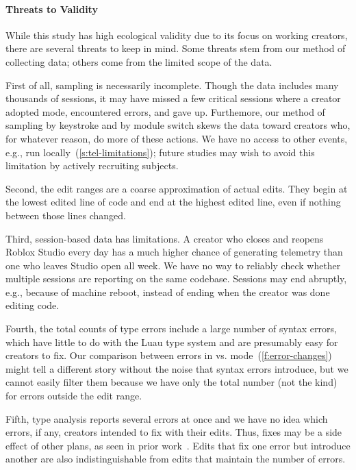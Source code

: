 \documentclass[english,submission,cleveref]{programming}
\begin{document}
\paragraph{Threats to Validity}
\label{s:threats}

While this study has high ecological validity due to its focus on
working creators, there are several threats to keep in mind.
Some threats stem from our method of collecting data; others
come from the limited scope of the data.

First of all, sampling is necessarily incomplete.
Though the data includes many thousands of sessions, it
may have missed a few critical sessions where a creator
adopted \mstrict{} mode, encountered  errors,
and gave up.
Furthemore, our method of sampling by keystroke and by module switch
skews the data toward creators who, for whatever reason, do more
of these actions.
We have no access to other events, e.g., run locally~(\cref{s:tel-limitations});
future studies may wish to avoid this limitation by actively
recruiting subjects.

Second, the edit ranges are a coarse approximation of actual edits.
They begin at the lowest edited line of code and end at the highest
edited line, even if nothing between those lines changed.

Third, session-based data has limitations.
A creator who closes and reopens Roblox Studio every day has
a much higher chance of generating telemetry than one who
leaves Studio open all week.
We have no way to reliably check whether multiple sessions are
reporting on the same codebase.
Sessions may end abruptly, e.g., because of machine reboot,
instead of ending when the creator was done editing code.

Fourth, the total counts of type errors include a large number of syntax errors,
which have little to do with the Luau type system and are presumably easy for
creators to fix.
Our comparison between \FS{} errors in \mnocheck{} vs.
\mstrict{} mode~(\cref{f:error-changes}) might tell a different story
without the noise that syntax errors introduce, but we cannot easily
filter them because we have only the total number (not the kind)
for errors outside the edit range.

Fifth, type analysis reports several errors at once and we have no idea which
errors, if any, creators intended to fix with their edits.
Thus, fixes may be a side effect of other plans, as seen in prior work~\cite{mfk-sigcse-2011}.
Edits that fix one error but introduce another are also indistinguishable
from edits that maintain the number of errors.
\end{document}
